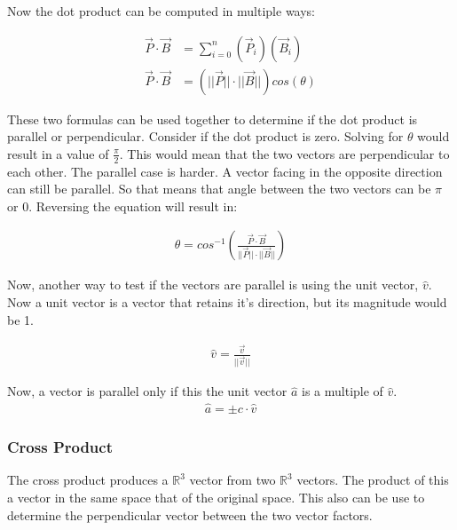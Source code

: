 \begin{center}  \end{center}

Now the dot product can be computed in multiple ways:

\begin{align*}	
	\vec{P} \cdot \vec{B} &= \sum^{n}_{i=0} (\vec{P}_i)(\vec{B}_i) \\ 
	\vec{P} \cdot \vec{B} &= (|| \vec{P} || \cdot || \vec{B} || )cos(\theta)
\end{align*}

These two formulas can be used together to determine if the dot product is parallel or perpendicular. 
Consider if the dot product is zero. Solving for $\theta$ would result in a value of $\frac{\pi}{2}$. This would mean that the two vectors
are perpendicular to each other. The parallel case is harder. 
A vector facing in the opposite direction can still be parallel. So that means that angle between the two vectors can be $\pi$ or $0$. Reversing the equation will result in: 

\begin{align*}
	\theta = cos^{-1}(\frac{\vec{P} \cdot \vec{B}}{|| \vec{P} || \cdot || \vec{B} ||})
\end{align*}

Now, another way to test if the vectors are parallel is using the unit vector, $\hat{v}$. Now a unit vector is a 
vector that retains it's direction, but its magnitude would be 1. 

\begin{align*}
	\hat{v} = \frac{\vec{v}}{|| \vec{v} ||}
\end{align*}

Now, a vector is parallel only if this the unit vector $\hat{a}$ is a multiple of $\hat{v}$. 
\begin{align*}
	\hat{a} = \pm c \cdot \hat{v}
\end{align*}

\subsubsection{Cross Product}
The cross product produces a $\mathbb{R}^{3}$ vector from two $\mathbb{R}^{3}$ vectors. The product of this a vector in the same space 
that of the original space. This also can be use to determine the perpendicular vector between the two vector factors. 

\begin{center}  \end{center}

